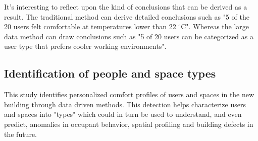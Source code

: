 It's interesting to reflect upon the kind of conclusions that can be derived as a result. The traditional method can derive detailed conclusions such as "5 of the 20 users felt comfortable at temperatures lower than 22 $^\circ$C". Whereas the large data method can draw conclusions such as "5 of 20 users can be categorized as a user type that prefers cooler working environments". 



\subsection{Identification of people and space types}

This study identifies personalized comfort profiles of users and spaces in the new building through data driven methods. This detection helps characterize users and spaces into "types" which could in turn be used to understand, and even predict, anomalies in occupant behavior, spatial profiling and building defects in the future.







